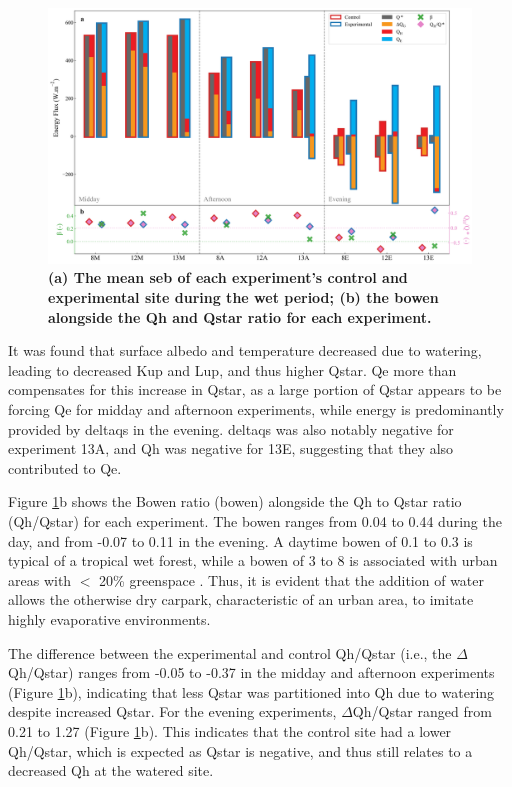 \documentclass[final,3p,times,authoryear]{elsarticle}
\begin{document}
\begin{figure}
\centering
\includegraphics[trim={0 0 0 0},clip,scale=0.4]{seb.png}
\caption{\bf (a) The mean \gls{seb} of each experiment's control and experimental site during the wet period; (b) the \gls{bowen} alongside the \gls{Qh} and \gls{Qstar} ratio for each experiment.}
 \label{fig:3.6}
\end{figure}

It was found that surface albedo and temperature decreased due to watering, leading to decreased \gls{Kup} and \gls{Lup}, and thus higher \gls{Qstar}. \gls{Qe} more than compensates for this increase in \gls{Qstar}, as a large portion of \gls{Qstar} appears to be forcing \gls{Qe} for midday and afternoon experiments, while energy is predominantly provided by \gls{deltaqs} in the evening. \gls{deltaqs} was also notably negative for experiment 13A, and \gls{Qh} was negative for 13E, suggesting that they also contributed to \gls{Qe}.

Figure \ref{fig:3.6}b shows the Bowen ratio (\gls{bowen}) alongside the \gls{Qh} to \gls{Qstar} ratio (\gls{Qh}/\gls{Qstar}) for each experiment. The \gls{bowen} ranges from 0.04 to 0.44 during the day, and from -0.07 to 0.11 in the evening. A daytime \gls{bowen} of 0.1 to 0.3 is typical of a tropical wet forest, while a \gls{bowen} of 3 to 8 is associated with urban areas with $<$ 20\% greenspace \citep{Oke2017}. Thus, it is evident that the addition of water allows the otherwise dry carpark, characteristic of an urban area, to imitate highly evaporative environments.

The difference between the experimental and control \gls{Qh}/\gls{Qstar} (i.e., the $\Delta$\gls{Qh}/\gls{Qstar}) ranges from -0.05 to -0.37 in the midday and afternoon experiments (Figure \ref{fig:3.6}b), indicating that less \gls{Qstar} was partitioned into \gls{Qh} due to watering despite increased \gls{Qstar}. For the evening experiments, $\Delta$\gls{Qh}/\gls{Qstar} ranged from 0.21 to 1.27 (Figure \ref{fig:3.6}b). This indicates that the control site had a lower \gls{Qh}/\gls{Qstar}, which is expected as \gls{Qstar} is negative, and thus still relates to a decreased \gls{Qh} at the watered site.
\end{document}
